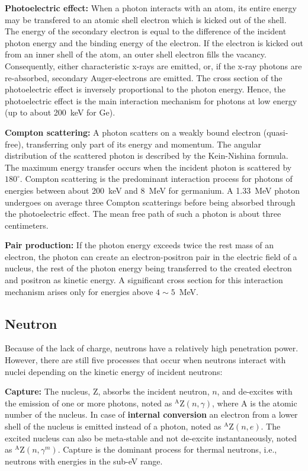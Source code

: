 \textbf{Photoelectric effect:} When a photon interacts with an atom, its entire energy may be transfered to an atomic shell electron which is kicked out of the shell. The energy of the secondary electron is equal to the difference of the incident photon energy and the binding energy of the electron. If the electron is kicked out from an inner shell of the atom, an outer shell electron fills the vacancy. Consequently, either characteristic x-rays are emitted, or, if the x-ray photons are re-absorbed, secondary Auger-electrons are emitted. The cross section of the photoelectric effect is inversely proportional to the photon energy. Hence, the photoelectric effect is the main interaction mechanism for photons at low energy (up to about 200~keV for Ge).

\textbf{Compton scattering:} A photon scatters on a weakly bound electron (quasi-free), transferring only part of its energy and momentum. The angular distribution of the scattered photon is described by the Kein-Nishina formula. The maximum energy transfer occurs when the incident photon is scattered by $180^{\circ}$. Compton scattering is the predominant interaction process for photons of energies between about 200~keV and 8~MeV for germanium. A 1.33~MeV photon undergoes on average three Compton scatterings before being absorbed through the photoelectric effect. The mean free path of such a photon is about three centimeters.

\textbf{Pair production:} If the photon energy exceeds twice the rest mass of an electron, the photon can create an electron-positron pair in the electric field of a nucleus, the rest of the photon energy being transferred to the created electron and positron as kinetic energy. A significant cross section for this interaction mechanism arises only for energies above $4\sim5$~MeV.

\subsection{Neutron}
\label{sec:det:neutron}
Because of the lack of charge, neutrons have a relatively high penetration power. However, there are still five processes that occur when neutrons interact with nuclei depending on the kinetic energy of incident neutrons:

\textbf{Capture:} The nucleus, Z, absorbs the incident neutron, $n$, and de-excites with the emission of one or more photons, noted as $^{\text{A}}$Z$(n,\gamma)$, where A is the atomic number of the nucleus. In case of \textbf{internal conversion} an electron from a lower shell of the nucleus is emitted instead of a photon, noted as $^{\text{A}}$Z$(n,e)$. The excited nucleus can also be meta-stable and not de-excite instantaneously, noted as $^{\text{A}}$Z$(n,\gamma^{m})$. Capture is the dominant process for thermal neutrons, \textup{i.e.}, neutrons with energies in the sub-eV range.

